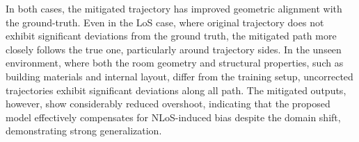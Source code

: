 In both cases, the mitigated trajectory has improved geometric alignment with the ground-truth. Even in the LoS case, where original trajectory does not exhibit significant deviations from the ground truth, the mitigated path more closely follows the true one, particularly around trajectory sides. In the unseen environment, where both the room geometry and structural properties, such as building materials and internal layout, differ from the training setup, uncorrected trajectories exhibit significant deviations along all path. The mitigated outputs, however, show considerably reduced overshoot, indicating that the proposed model effectively compensates for NLoS-induced bias despite the domain shift, demonstrating strong generalization.
